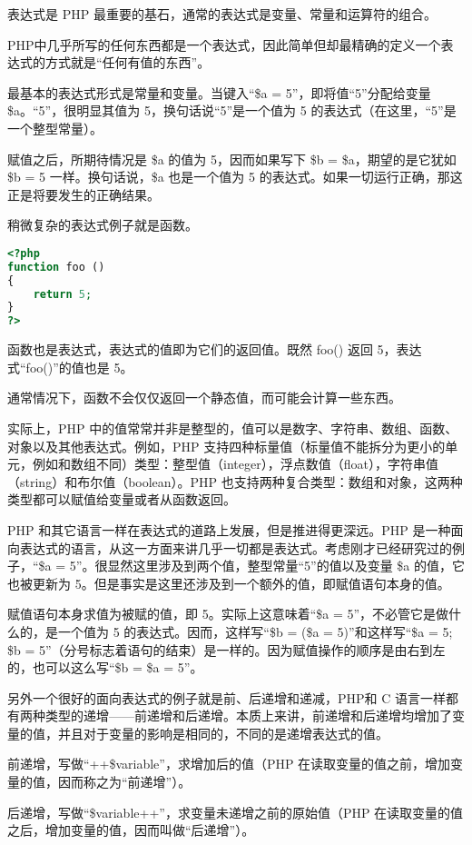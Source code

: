 表达式是 PHP 最重要的基石，通常的表达式是变量、常量和运算符的组合。

PHP中几乎所写的任何东西都是一个表达式，因此简单但却最精确的定义一个表达式的方式就是“任何有值的东西”。



最基本的表达式形式是常量和变量。当键入“\$a = 5”，即将值“5”分配给变量 \$a。“5”，很明显其值为 5，换句话说“5”是一个值为 5 的表达式（在这里，“5”是一个整型常量）。

赋值之后，所期待情况是 \$a 的值为 5，因而如果写下 \$b = \$a，期望的是它犹如 \$b = 5 一样。换句话说，\$a 也是一个值为 5 的表达式。如果一切运行正确，那这正是将要发生的正确结果。

稍微复杂的表达式例子就是函数。

\begin{lstlisting}[language=PHP]
<?php
function foo ()
{
    return 5;
}
?>
\end{lstlisting}

函数也是表达式，表达式的值即为它们的返回值。既然 foo() 返回 5，表达式“foo()”的值也是 5。

通常情况下，函数不会仅仅返回一个静态值，而可能会计算一些东西。

实际上，PHP 中的值常常并非是整型的，值可以是数字、字符串、数组、函数、对象以及其他表达式。例如，PHP 支持四种标量值（标量值不能拆分为更小的单元，例如和数组不同）类型：整型值（integer），浮点数值（float），字符串值（string）和布尔值（boolean）。PHP 也支持两种复合类型：数组和对象，这两种类型都可以赋值给变量或者从函数返回。

PHP 和其它语言一样在表达式的道路上发展，但是推进得更深远。PHP 是一种面向表达式的语言，从这一方面来讲几乎一切都是表达式。考虑刚才已经研究过的例子，“\$a = 5”。很显然这里涉及到两个值，整型常量“5”的值以及变量 \$a 的值，它也被更新为 5。但是事实是这里还涉及到一个额外的值，即赋值语句本身的值。

赋值语句本身求值为被赋的值，即 5。实际上这意味着“\$a = 5”，不必管它是做什么的，是一个值为 5 的表达式。因而，这样写“\$b = (\$a = 5)”和这样写“\$a = 5; \$b = 5”（分号标志着语句的结束）是一样的。因为赋值操作的顺序是由右到左的，也可以这么写“\$b = \$a = 5”。

另外一个很好的面向表达式的例子就是前、后递增和递减，PHP和 C 语言一样都有两种类型的递增——前递增和后递增。本质上来讲，前递增和后递增均增加了变量的值，并且对于变量的影响是相同的，不同的是递增表达式的值。

\begin{compactitem}
\item 前递增，写做“++\$variable”，求增加后的值（PHP 在读取变量的值之前，增加变量的值，因而称之为“前递增”）。
\item 后递增，写做“\$variable++”，求变量未递增之前的原始值（PHP 在读取变量的值之后，增加变量的值，因而叫做“后递增”）。
\end{compactitem}


